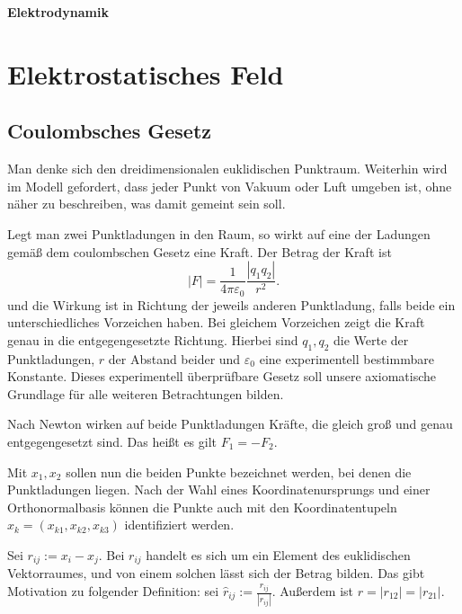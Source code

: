 \documentclass[a4paper,11pt,fleqn,twocolumn,twoside,dvipdfmx]{scrartcl}
\begin{document}
\thispagestyle{empty}

\begin{huge}
\noindent
\textbf{Elektrodynamik}
\par
\end{huge}


\tableofcontents

\section{Elektrostatisches Feld}
\subsection{Coulombsches Gesetz}

Man denke sich den dreidimensionalen euklidischen Punktraum.
Weiterhin wird im Modell gefordert, dass jeder Punkt von Vakuum oder
Luft umgeben ist, ohne näher zu beschreiben, was damit gemeint sein
soll.

Legt man zwei Punktladungen in den Raum, so wirkt auf eine der
Ladungen gemäß dem coulombschen Gesetz eine Kraft.
Der Betrag der Kraft ist
\begin{equation}\label{Coulomb}
|F|=\frac{1}{4\pi\varepsilon_0}\frac{|q_1q_2|}{r^2}.
\end{equation}
und die Wirkung ist in Richtung der jeweils anderen Punktladung,
falls beide ein unterschiedliches Vorzeichen haben. Bei gleichem
Vorzeichen zeigt die Kraft genau in die entgegengesetzte Richtung.
Hierbei sind $q_1,q_2$ die Werte der Punktladungen, $r$ der
Abstand beider und $\varepsilon_0$ eine experimentell bestimmbare
Konstante. Dieses experimentell überprüfbare Gesetz soll unsere
axiomatische Grundlage für alle weiteren Betrachtungen bilden.

Nach Newton wirken auf beide Punktladungen Kräfte, die gleich groß
und genau entgegengesetzt sind. Das heißt es gilt $F_1=-F_2$.

Mit $x_1,x_2$ sollen nun die beiden Punkte bezeichnet werden,
bei denen die Punktladungen liegen. Nach der Wahl eines
Koordinatenursprungs und einer Orthonormalbasis können die
Punkte auch mit den Koordinatentupeln $x_k=(x_{k1},x_{k2},x_{k3})$
identifiziert werden.

Sei $r_{ij}:=x_i-x_j$. Bei $r_{ij}$ handelt es sich um ein
Element des euklidischen Vektorraumes, und von einem solchen lässt
sich der Betrag bilden. Das gibt Motivation zu folgender
Definition: sei $\hat r_{ij}:=\frac{r_{ij}}{|r_{ij}|}$.
Außerdem ist $r=|r_{12}|=|r_{21}|$.
\end{document}
